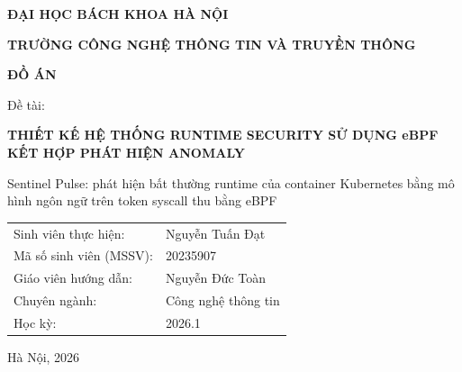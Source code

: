 \documentclass[a4paper,fontsize=13pt,oneside,listof=totoc,bibliography=totoc,numbers=noenddot]{scrreprt}
\begin{document}
\begin{titlepage}
  \centering
  {\large\bfseries ĐẠI HỌC BÁCH KHOA HÀ NỘI\par}
  {\large\bfseries TRƯỜNG CÔNG NGHỆ THÔNG TIN VÀ TRUYỀN THÔNG\par}
  \vspace{2.5cm}
  {\Large\bfseries ĐỒ ÁN\par}
  \vspace{1cm}
  {\large Đề tài:\par}
  \vspace{0.3cm}
  {\LARGE\bfseries THIẾT KẾ HỆ THỐNG RUNTIME SECURITY SỬ DỤNG eBPF KẾT HỢP PHÁT HIỆN ANOMALY\par}
  \vspace{0.8cm}
  {\large Sentinel Pulse: phát hiện bất thường runtime của container Kubernetes bằng mô hình ngôn ngữ trên token syscall thu bằng eBPF\par}
  \vspace{2.5cm}
  {\large
  \begin{tabular}{@{}ll@{}}
    Sinh viên thực hiện: & Nguyễn Tuấn Đạt \\
    Mã số sinh viên (MSSV): & 20235907 \\
    Giáo viên hướng dẫn: & Nguyễn Đức Toàn \\
    Chuyên ngành: & Công nghệ thông tin \\
    Học kỳ: & 2026.1 \\
  \end{tabular}\par}
  \vfill
  {\large Hà Nội, 2026\par}
\end{titlepage}


\tableofcontents
\listoffigures
\listoftables

\cleardoublepage
{}












\end{document}
